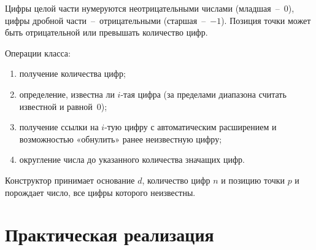 \documentclass[a4paper, 14pt]{extarticle}
\begin{document}
Цифры целой части нумеруются неотрицательными числами (младшая~--~$0$), цифры дробной части~--~отрицательными (старшая~--~$-1$). Позиция точки может быть отрицательной или превышать количество цифр.

Операции класса:
\begin{enumerate}[nosep]
    \item получение количества цифр;
    \item определение, известна ли $i$-тая цифра (за пределами диапазона считать известной и равной~$0$);
    \item получение ссылки на $i$-тую цифру с автоматическим расширением и возможностью «обнулить» ранее неизвестную цифру;
    \item округление числа до указанного количества значащих цифр.
\end{enumerate}

Конструктор принимает основание $d$, количество цифр $n$ и позицию точки $p$ и порождает число, все цифры которого неизвестны.

\section{Практическая реализация}
\end{document}
